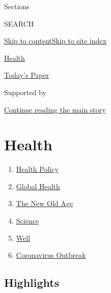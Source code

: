 Sections

SEARCH

\protect\hyperlink{site-content}{Skip to
content}\protect\hyperlink{site-index}{Skip to site index}

\href{https://www.nytimes3xbfgragh.onion/section/health}{Health}

\href{https://myaccount.nytimes3xbfgragh.onion/auth/login?response_type=cookie\&client_id=vi}{}

\href{https://www.nytimes3xbfgragh.onion/section/todayspaper}{Today's
Paper}

Supported by

\protect\hyperlink{after-sponsor}{Continue reading the main story}

\hypertarget{health}{%
\section{Health}\label{health}}

\begin{enumerate}
\def\labelenumi{\arabic{enumi}.}
\tightlist
\item
  \href{/section/health/policy}{Health Policy}
\item
  \href{/column/global-health}{Global Health}
\item
  \href{/column/the-new-old-age}{The New Old Age}
\item
  \href{/section/science}{Science}
\item
  \href{/section/well/}{Well}
\item
  \href{/news-event/coronavirus}{Coronavirus Outbreak}
\end{enumerate}

\hypertarget{highlights}{%
\subsection{Highlights}\label{highlights}}

